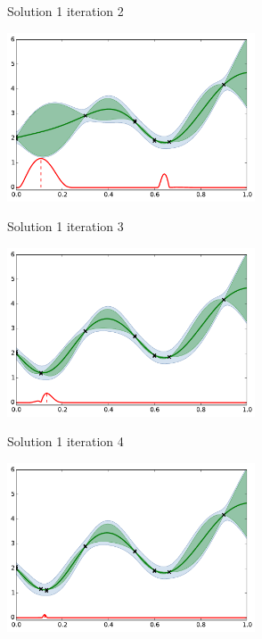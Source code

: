 \documentclass{beamer}
\begin{document}
\begin{frame}[noframenumbering]{Solution 1}
iteration 2
\begin{center}
\includegraphics[height=5cm]{figures/python/ego_EI1n2}
\end{center}
\end{frame}

\begin{frame}[noframenumbering]{Solution 1}
iteration 3
\begin{center}
\includegraphics[height=5cm]{figures/python/ego_EI1n3}
\end{center}
\end{frame}

\begin{frame}[noframenumbering]{Solution 1}
iteration 4
\begin{center}
\includegraphics[height=5cm]{figures/python/ego_EI1n4}
\end{center}
\end{frame}
\end{document}
